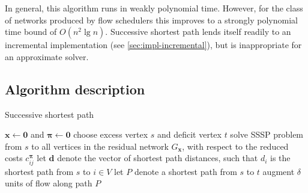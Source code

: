 
In general, this algorithm runs in weakly polynomial time. However, for the class of networks produced by flow schedulers this improves to a strongly polynomial time bound of $O(n^2 \lg n)$. Successive shortest path lends itself readily to an incremental implementation (see \cref{sec:impl-incremental}), but is inappropriate for an approximate solver.

\subsection{Algorithm description}

\begin{algorithm}
    \caption{Successive shortest path}
    \label{algo:successive-shortest-path}
    \begin{algorithmic}[1]
        \State $\mathbf{x} \gets \mathbf{0}$ and $\boldsymbol{\pi} \gets \mathbf{0}$
         \label{algo:successive-shortest-path:start-loop}
          \State choose excess vertex $s$ and deficit vertex $t$\footnotemark \label{algo:successive-shortest-path:select-active}
          \State solve SSSP problem from $s$ to all vertices in the residual network $G_{\mathbf{x}}$, with respect to the reduced costs $c^{\boldsymbol{\pi}}_{ij}$ \label{algo:successive-shortest-path:solve-sssp}
          \State let $\mathbf{d}$ denote the vector of shortest path distances, such that $d_i$ is the shortest path from $s$ to $i\in V$
           \label{algo:successive-shortest-path:update-potentials}
          \State let $P$ denote a shortest path from $s$ to $t$
           \label{algo:successive-shortest-path:compute-delta}
          \State augment $\delta$ units of flow along path $P$ \label{algo:successive-shortest-path:augment-flow}
        \EndWhile \label{algo:successive-shortest-path:end-loop}
    \end{algorithmic}
\end{algorithm}


